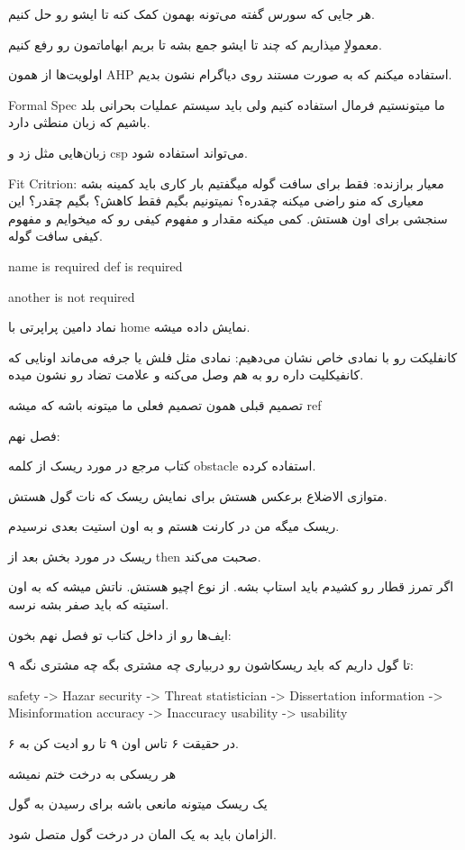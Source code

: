 هر جایی که سورس گفته می‌تونه بهمون کمک کنه تا ایشو رو حل کنیم.

معمولاٍ میذاریم که چند تا ایشو جمع بشه تا بریم ابهاماتمون رو رفع کنیم.

اولویت‌ها از همون AHP استفاده میکنم که به صورت مستند روی دیاگرام نشون بدیم.

Formal Spec ما میتونستیم فرمال استفاده کنیم ولی باید سیستم عملیات بحرانی بلد
باشیم که زبان منطثی دارد.

زبان‌هایی مثل زد و csp می‌تواند استفاده شود.

Fit Critrion: معیار برازنده: فقط برای سافت گوله
میگفتیم بار کاری باید کمینه بشه معیاری که منو راضی میکنه چقدره؟ نمیتونیم بگیم
فقط کاهش؟ بگیم چقدر؟ این سنجشی برای اون هستش. کمی میکنه مقدار و مفهوم کیفی رو
که
میخوایم و مفهوم کیفی سافت گوله.

name is required
def is required

another is not required

نماد دامین پراپرتی با home نمایش داده میشه.

کانفلیکت رو با نمادی خاص نشان می‌دهیم: نمادی مثل فلش یا جرفه می‌ماند اونایی که
کانفیکلیت داره رو به هم وصل می‌کنه و علامت تضاد رو نشون میده.

تصمیم قبلی همون تصمیم فعلی ما میتونه باشه که میشه ref

فصل نهم:

کتاب مرجع در مورد ریسک از کلمه obstacle استفاده کرده.

متوازی الاضلاع برعکس هستش برای نمایش ریسک که نات گول هستش.

ریسک میگه من در کارنت هستم و به اون استیت بعدی نرسیدم.

ریسک در مورد بخش بعد از then صحبت می‌کند.

اگر تمرز قطار رو کشیدم باید استاپ بشه. از نوع اچیو هستش. ناتش میشه که به اون
استیته که باید صفر بشه نرسه.

ایف‌ها رو از داخل کتاب تو فصل نهم بخون:

۹ تا گول داریم که باید ریسکاشون رو دربیاری چه مشتری بگه چه مشتری نگه:

safety -> Hazar
security -> Threat
statistician -> Dissertation
information -> Misinformation
accuracy -> Inaccuracy
usability -> usability

در حقیقت ۶ تاس اون ۹ تا رو ادیت کن به ۶.

هر ریسکی به درخت ختم نمیشه

یک ریسک میتونه مانعی باشه برای رسیدن به گول

الزامان باید به یک المان در درخت گول متصل شود.

